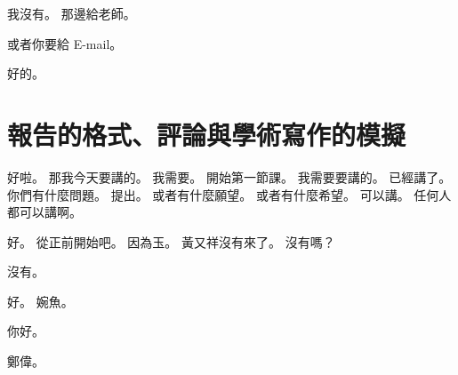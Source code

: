 \hypertarget{w01:cue:1583}{}我沒有。
\hypertarget{w01:cue:1584}{}那邊給老師。

\hypertarget{w01:cue:1585}{}或者你要給 E-mail。

\hypertarget{w01:cue:1586}{}好的。

\section{報告的格式、評論與學術寫作的模擬}

\hypertarget{w01:cue:1587}{}好啦。
\hypertarget{w01:cue:1588}{}那我今天要講的。
\hypertarget{w01:cue:1589}{}我需要。
\hypertarget{w01:cue:1590}{}開始第一節課。
\hypertarget{w01:cue:1591}{}我需要要講的。
\hypertarget{w01:cue:1592}{}已經講了。
\hypertarget{w01:cue:1593}{}你們有什麼問題。
\hypertarget{w01:cue:1594}{}提出。
\hypertarget{w01:cue:1595}{}或者有什麼願望。
\hypertarget{w01:cue:1596}{}或者有什麼希望。
\hypertarget{w01:cue:1597}{}可以講。
\hypertarget{w01:cue:1598}{}任何人都可以講啊。

\hypertarget{w01:cue:1599}{}好。
\hypertarget{w01:cue:1600}{}從正前開始吧。
\hypertarget{w01:cue:1601}{}因為玉。
\hypertarget{w01:cue:1602}{}黃又祥沒有來了。
\hypertarget{w01:cue:1603}{}沒有嗎？

\hypertarget{w01:cue:1604}{}沒有。

\hypertarget{w01:cue:1605}{}好。
\hypertarget{w01:cue:1606}{}婉魚。

\hypertarget{w01:cue:1607}{}你好。

\hypertarget{w01:cue:1608}{}鄭偉。

